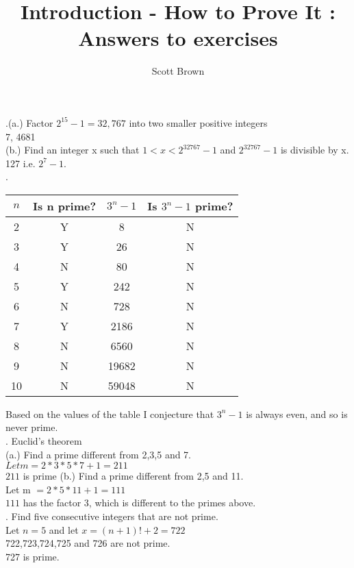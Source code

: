 \documentclass{article}
\begin{document}
\title{Introduction - How to Prove It : Answers to exercises}
\author{Scott Brown}
.(a.) Factor $2^15 - 1 = 32,767$ into two smaller positive integers\\
       7, 4681\\
  (b.) Find an integer x such that $1 < x < 2^{32767} - 1$ and $2^{32767} - 1$ is divisible by x.\\
127 i.e. $2^7 - 1$.\\
. \begin{tabular}{c|c|c|c}
$n$&Is n prime?&$3^n - 1$&Is $3^n - 1$ prime?\\
\hline
2&Y&8&N\\
3&Y&26&N\\
4&N&80&N\\
5&Y&242&N\\
6&N&728&N\\
7&Y&2186&N\\
8&N&6560&N\\
9&N&19682&N\\
10&N&59048&N\\
\end{tabular}
Based on the values of the table I conjecture that $3^n - 1$ is always even, and so is never prime.\\
. Euclid's theorem\\
(a.) Find a prime different from 2,3,5 and 7.\\
   $Let m = 2 * 3 * 5 * 7 + 1 = 211$\\
   $211$ is prime
(b.) Find a prime different from 2,5 and 11.\\
     Let m $ = 2 * 5 * 11 + 1 = 111$\\
     $ 111$ has the factor 3, which is different to the primes above.\\
. Find five consecutive integers that are not prime.\\
Let $n = 5$ and let $x = (n + 1)! + 2 = 722$\\
722,723,724,725 and 726 are not prime.\\
727 is prime.\\
\linebreak
\end{document}
